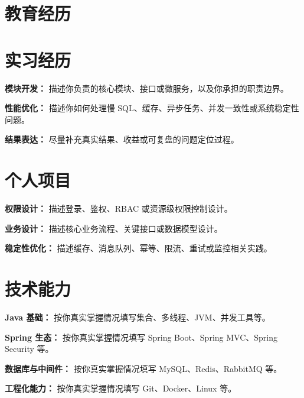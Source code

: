\documentclass[11pt,a4paper]{resume}
\begin{document}
\MakeResumeHeader

\section{教育经历}

\section{实习经历}
\begin{ResumeItemList}
  \item \textbf{模块开发：} 描述你负责的核心模块、接口或微服务，以及你承担的职责边界。
  \item \textbf{性能优化：} 描述你如何处理慢 SQL、缓存、异步任务、并发一致性或系统稳定性问题。
  \item \textbf{结果表达：} 尽量补充真实结果、收益或可复盘的问题定位过程。
\end{ResumeItemList}

\section{个人项目}
\begin{ResumeItemList}
  \item \textbf{权限设计：} 描述登录、鉴权、RBAC 或资源级权限控制设计。
  \item \textbf{业务设计：} 描述核心业务流程、关键接口或数据模型设计。
  \item \textbf{稳定性优化：} 描述缓存、消息队列、幂等、限流、重试或监控相关实践。
\end{ResumeItemList}

\section{技术能力}
\begin{ResumeItemList}
  \item \textbf{Java 基础：} 按你真实掌握情况填写集合、多线程、JVM、并发工具等。
  \item \textbf{Spring 生态：} 按你真实掌握情况填写 Spring Boot、Spring MVC、Spring Security 等。
  \item \textbf{数据库与中间件：} 按你真实掌握情况填写 MySQL、Redis、RabbitMQ 等。
  \item \textbf{工程化能力：} 按你真实掌握情况填写 Git、Docker、Linux 等。
\end{ResumeItemList}
\end{document}
